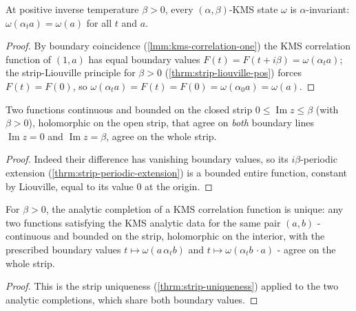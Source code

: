 \begin{theorem}
    \label{thrm:kms-invariance}
    \leanok
    At positive inverse temperature $\beta > 0$, every $(\alpha, \beta)$-KMS state $\omega$ is $\alpha$-invariant: $\omega(\alpha_t a) = \omega(a)$ for all $t$ and $a$.
\end{theorem}
\begin{proof}
    \leanok
    By boundary coincidence (\ref{lmm:kms-correlation-one}) the KMS correlation function of $(1, a)$ has equal boundary values $F(t) = F(t + i\beta) = \omega(\alpha_t a)$; the strip-Liouville principle for $\beta > 0$ (\ref{thrm:strip-liouville-pos}) forces $F(t) = F(0)$, so $\omega(\alpha_t a) = F(t) = F(0) = \omega(\alpha_0 a) = \omega(a)$.
\end{proof}

\begin{theorem}
    \label{thrm:strip-uniqueness}
    \leanok
    Two functions continuous and bounded on the closed strip $0 \le \operatorname{Im} z \le \beta$ (with $\beta > 0$), holomorphic on the open strip, that agree on \emph{both} boundary lines $\operatorname{Im} z = 0$ and $\operatorname{Im} z = \beta$, agree on the whole strip.
\end{theorem}
\begin{proof}
    \leanok
    Indeed their difference has vanishing boundary values, so its $i\beta$-periodic extension (\ref{thrm:strip-periodic-extension}) is a bounded entire function, constant by Liouville, equal to its value $0$ at the origin.
\end{proof}

\begin{theorem}
    \label{thrm:kms-correlation-unique}
    \leanok
    For $\beta > 0$, the analytic completion of a KMS correlation function is unique: any two functions satisfying the KMS analytic data for the same pair $(a, b)$ - continuous and bounded on the strip, holomorphic on the interior, with the prescribed boundary values $t \mapsto \omega(a\,\alpha_t b)$ and $t \mapsto \omega(\alpha_t b\,\cdot a)$ - agree on the whole strip.
\end{theorem}
\begin{proof}
    \leanok
    This is the strip uniqueness (\ref{thrm:strip-uniqueness}) applied to the two analytic completions, which share both boundary values.
\end{proof}


